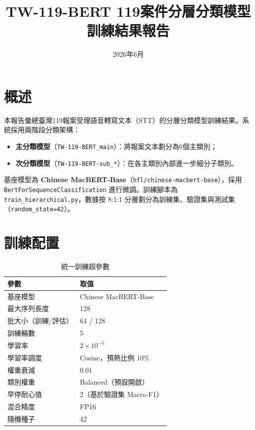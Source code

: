 \documentclass[UTF8,a4paper,11pt]{ctexart}
\title{TW-119-BERT 119案件分層分類模型\\訓練結果報告}
\author{}
\date{2026年6月}
\begin{document}
\maketitle

\section{概述}

本報告彙總臺灣119報案受理語音轉寫文本（STT）的分層分類模型訓練結果。系統採用兩階段分類架構：
\begin{itemize}
  \item \textbf{主分類模型}（\texttt{TW-119-BERT\_main}）：將報案文本劃分為6個主類別；
  \item \textbf{次分類模型}（\texttt{TW-119-BERT-sub\_*}）：在各主類別內部進一步細分子類別。
\end{itemize}

基座模型為 \textbf{Chinese MacBERT-Base}（\texttt{hfl/chinese-macbert-base}），採用 \texttt{BertForSequenceClassification} 進行微調。訓練腳本為 \texttt{train\_hierarchical.py}，數據按 8:1:1 分層劃分為訓練集、驗證集與測試集（\texttt{random\_state=42}）。

\section{訓練配置}

\begin{table}[htbp]
  \centering
  \caption{統一訓練超參數}
  \label{tab:hyperparams}
  \begin{tabular}{ll}
    \toprule
    參數 & 取值 \\
    \midrule
    基座模型 & Chinese MacBERT-Base \\
    最大序列長度 & 128 \\
    批大小（訓練/評估） & 64 / 128 \\
    訓練輪數 & 5 \\
    學習率 & $2 \times 10^{-5}$ \\
    學習率調度 & Cosine，預熱比例 10\% \\
    權重衰減 & 0.01 \\
    類別權重 & Balanced（預設開啟） \\
    早停耐心值 & 2（基於驗證集 Macro-F1） \\
    混合精度 & FP16 \\
    隨機種子 & 42 \\
    \bottomrule
  \end{tabular}
\end{table}
\end{document}
